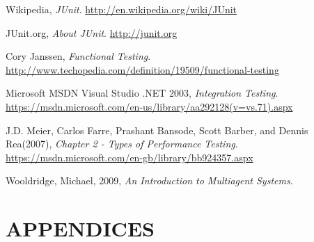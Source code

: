 \documentclass[11pt,a4paper]{article}
\begin{document}
\begin{thebibliography}{9}
	Wikipedia,
	\emph{JUnit}.
	\url{http://en.wikipedia.org/wiki/JUnit}
	
	JUnit.org,
	\emph{About JUnit}.
	\url{http://junit.org}
	
	Cory Janssen,
	\emph{Functional Testing}.
	\url{http://www.techopedia.com/definition/19509/functional-testing}
	
	Microsoft MSDN Visual Studio .NET 2003,
	\emph{Integration Testing}.
	\url{https://msdn.microsoft.com/en-us/library/aa292128(v=vs.71).aspx}
	
	J.D. Meier, Carlos Farre, Prashant Bansode, Scott Barber, and Dennis Rea(2007),
	\emph{Chapter 2 - Types of Performance Testing}.
	\url{https://msdn.microsoft.com/en-gb/library/bb924357.aspx}
	
	Wooldridge, Michael,  2009,
	\emph{An Introduction to Multiagent Systems}.
	
\end{thebibliography}

\section{APPENDICES}


\end{document}
